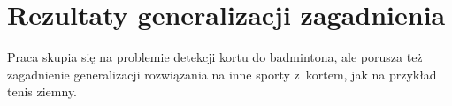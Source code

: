 \section{Rezultaty generalizacji zagadnienia}
\label{sec:generalizacja}

Praca skupia się na problemie detekcji kortu do badmintona, ale porusza też zagadnienie generalizacji rozwiązania na inne sporty z~kortem, jak na przykład tenis ziemny.
\\


